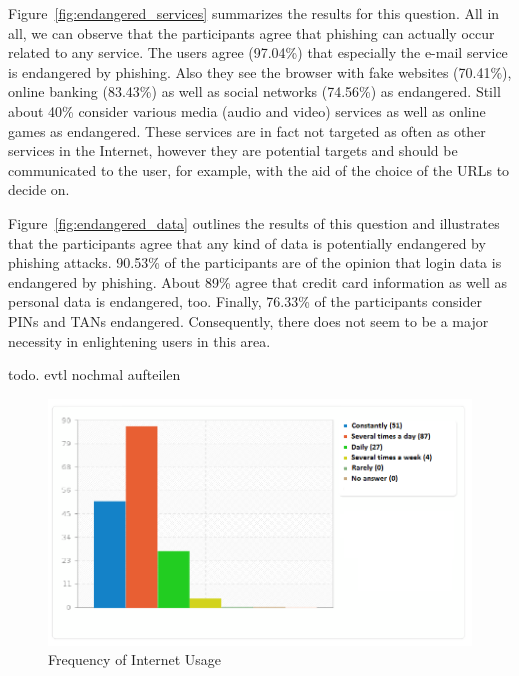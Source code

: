 \begin{description}[leftmargin=0cm]
	\item[Services endangered by phishing] Figure~\ref{fig:endangered_services} summarizes the results for this question.
 All in all, we can observe that the participants agree that phishing can actually occur related to any service.
 The users agree (97.04\%) that especially the e-mail service is endangered by phishing.
 Also they see the browser with fake websites (70.41\%), online banking (83.43\%) as well as social networks (74.56\%) as endangered.
 Still about 40\% consider various media (audio and video) services as well as online games as endangered.
 These services are in fact not targeted as often as other services in the Internet, however they are potential targets and should be communicated to the user, for example, with the aid of the choice of the URLs to decide on.

	\item[Data endangered by phishing] Figure~\ref{fig:endangered_data} outlines the results of this question and illustrates that the participants agree that any kind of data is potentially endangered by phishing attacks.
 90.53\% of the participants are of the opinion that login data is endangered by phishing.
 About 89\% agree that credit card information as well as personal data is endangered, too.
 Finally, 76.33\% of the participants consider PINs and TANs endangered.
 Consequently, there does not seem to be a major necessity in enlightening users in this area.

	\item[Preferences for an education app] todo.
 evtl nochmal aufteilen
\end{description}


\begin{figure}[hHtbp]
\includegraphics[width=1.0\textwidth]{graphix/internet_usage.png}%
\caption{Frequency of Internet Usage}%
\label{fig:internet_usage}%
\end{figure}


